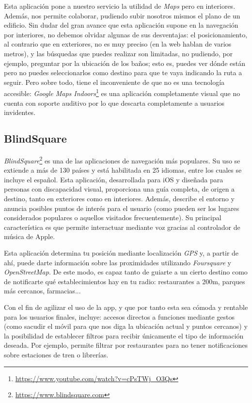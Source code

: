 Esta aplicación pone a nuestro servicio la utilidad de \textit{Maps} pero en interiores. Además, nos permite colaborar, pudiendo subir nosotros mismos el plano de un edificio. Sin dudar del gran avance que esta aplicación supone en la navegación por interiores, no debemos olvidar algunas de sus desventajas: el posicionamiento, al contrario que en exteriores, no es muy preciso (en la web hablan de varios metros), y las búsquedas que puedes realizar son limitadas, no pudiendo, por ejemplo, preguntar por la ubicación de los baños; esto es, puedes ver dónde están pero no puedes seleccionarlos como destino para que te vaya indicando la ruta a seguir. Pero sobre todo, tiene el inconveniente de que no es una tecnología accesible: \textit{Google Maps Indoors}\footnote{\url{https://www.youtube.com/watch?v=cPsTWj_O3Qs}} es una aplicación completamente visual que no cuenta con soporte auditivo por lo que descarta completamente a usuarios invidentes.



\subsection{BlindSquare}
\textit{BlindSquare}\footnote{\url{https://www.blindsquare.com}} es una de las aplicaciones de navegación más populares. Su uso se extiende a más de 130 países y está habilitada en 25 idiomas, entre los cuales se incluye el español. Esta aplicación, desarrollada para iOS y diseñada para personas con discapacidad visual, proporciona una guía completa, de origen a destino, tanto en exteriores como en interiores. Además, describe el entorno y anuncia posibles puntos de interés para el usuario (como pueden ser los lugares considerados populares o aquellos visitados frecuentemente). Su principal característica es que permite interactuar mediante voz gracias al controlador de música de Apple. 

Esta aplicación determina tu posición mediante localización \textit{GPS} y, a partir de ahí, puede darte información sobre las proximidades utilizando \textit{Foursquare} y \textit{OpenStreetMap}. De este modo, es capaz tanto de guiarte a un cierto destino como de notificarte qué establecimientos hay en tu radio: restaurantes a 200m, parques más cercanos, farmacias...

Con el fin de agilizar el uso de la app, y que por tanto esta sea cómoda y rentable para los usuarios finales, incluye: accesos directos a funciones mediante gestos (como sacudir el móvil para que nos diga la ubicación actual y puntos cercanos) y la posibilidad de establecer filtros para recibir únicamente el tipo de información deseada. Por ejemplo, permite filtrar por restaurantes para no tener notificaciones sobre estaciones de tren o librerías.

